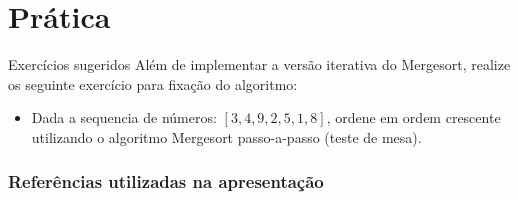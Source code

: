 \documentclass{beamer}
\begin{document}
	\section{Prática}

	\begin{frame}[c]{Exercícios sugeridos}
Além de implementar a versão iterativa do Mergesort, realize os seguinte exercício para fixação do algoritmo:
		\begin{itemize}
			\item Dada a sequencia de números: $[3, 4, 9, 2, 5, 1, 8]$, ordene em ordem crescente utilizando o algoritmo Mergesort passo-a-passo (teste de mesa).
		\end{itemize}

	\end{frame}





	\begin{frame}[allowframebreaks]
		\frametitle{Referências utilizadas na apresentação}
		
	\end{frame}
\end{document}
